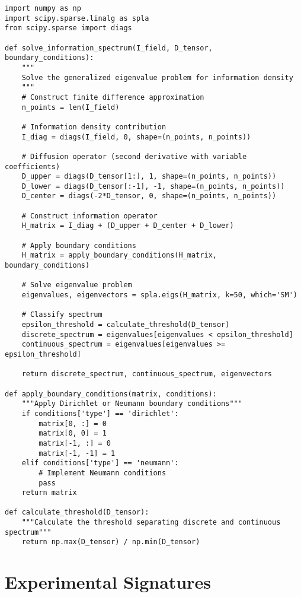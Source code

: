 \documentclass[12pt]{article}
\begin{document}
\begin{lstlisting}
import numpy as np
import scipy.sparse.linalg as spla
from scipy.sparse import diags

def solve_information_spectrum(I_field, D_tensor, boundary_conditions):
    """
    Solve the generalized eigenvalue problem for information density
    """
    # Construct finite difference approximation
    n_points = len(I_field)
    
    # Information density contribution
    I_diag = diags(I_field, 0, shape=(n_points, n_points))
    
    # Diffusion operator (second derivative with variable coefficients)
    D_upper = diags(D_tensor[1:], 1, shape=(n_points, n_points))
    D_lower = diags(D_tensor[:-1], -1, shape=(n_points, n_points))
    D_center = diags(-2*D_tensor, 0, shape=(n_points, n_points))
    
    # Construct information operator
    H_matrix = I_diag + (D_upper + D_center + D_lower)
    
    # Apply boundary conditions
    H_matrix = apply_boundary_conditions(H_matrix, boundary_conditions)
    
    # Solve eigenvalue problem
    eigenvalues, eigenvectors = spla.eigs(H_matrix, k=50, which='SM')
    
    # Classify spectrum
    epsilon_threshold = calculate_threshold(D_tensor)
    discrete_spectrum = eigenvalues[eigenvalues < epsilon_threshold]
    continuous_spectrum = eigenvalues[eigenvalues >= epsilon_threshold]
    
    return discrete_spectrum, continuous_spectrum, eigenvectors

def apply_boundary_conditions(matrix, conditions):
    """Apply Dirichlet or Neumann boundary conditions"""
    if conditions['type'] == 'dirichlet':
        matrix[0, :] = 0
        matrix[0, 0] = 1
        matrix[-1, :] = 0
        matrix[-1, -1] = 1
    elif conditions['type'] == 'neumann':
        # Implement Neumann conditions
        pass
    return matrix

def calculate_threshold(D_tensor):
    """Calculate the threshold separating discrete and continuous spectrum"""
    return np.max(D_tensor) / np.min(D_tensor)
\end{lstlisting}

\section{Experimental Signatures}
\end{document}
